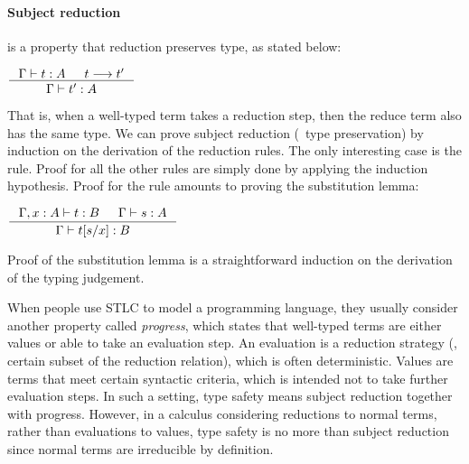 \paragraph{Subject reduction} is a property that reduction preserves type,
as stated below:
\begin{theorem}
	$\inference{\Gamma |- t : A  & t --> t'}{\Gamma |- t' : A}$
\end{theorem}
That is, when a well-typed term takes a reduction step, then the reduce term
also has the same type. We can prove subject reduction (\aka\ type preservation)
by induction on the derivation of the reduction rules.
The only interesting case is the  rule. Proof for all
the other rules are simply done by applying the induction hypothesis.
Proof for the  rule amounts to proving the substitution lemma:
\begin{lemma}[substitution]
$ \inference{\Gamma,x:A |- t : B  & \Gamma |- s : A}{\Gamma |- t[s/x] : B} $
\end{lemma}
Proof of the substitution lemma is a straightforward induction on
the derivation of the typing judgement.

When people use STLC to model a programming language,
they usually consider another property called \emph{progress},
which states that well-typed terms are either values or
able to take an evaluation step. An evaluation is a reduction strategy
(\ie, certain subset of the reduction relation), which is often deterministic.
Values are terms that meet certain syntactic criteria, which is intended not
to take further evaluation steps. In such a setting, type safety means
subject reduction together with progress. However, in a calculus considering
reductions to normal terms, rather than evaluations to values, type safety is
no more than subject reduction since normal terms are irreducible by definition.

